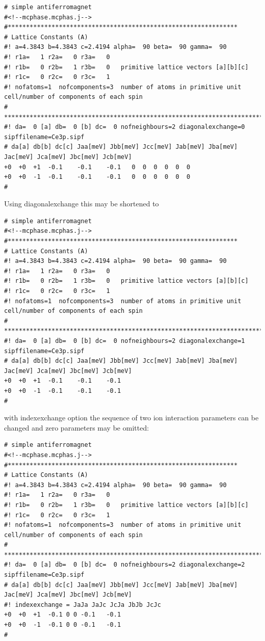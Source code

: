 {\small
\begin{verbatim} 
# simple antiferromagnet 
#<!--mcphase.mcphas.j-->
#***************************************************************
# Lattice Constants (A)
#! a=4.3843 b=4.3843 c=2.4194 alpha=  90 beta=  90 gamma=  90
#! r1a=   1 r2a=   0 r3a=   0
#! r1b=   0 r2b=   1 r3b=   0   primitive lattice vectors [a][b][c]
#! r1c=   0 r2c=   0 r3c=   1
#! nofatoms=1  nofcomponents=3  number of atoms in primitive unit cell/number of components of each spin
# ****************************************************************************
#! da=  0 [a] db=  0 [b] dc=  0 nofneighbours=2 diagonalexchange=0  sipffilename=Ce3p.sipf
# da[a] db[b] dc[c] Jaa[meV] Jbb[meV] Jcc[meV] Jab[meV] Jba[meV] Jac[meV] Jca[meV] Jbc[meV] Jcb[meV]
+0	+0	+1	-0.1	-0.1	-0.1   0  0  0  0  0  0
+0	+0	-1	-0.1	-0.1	-0.1   0  0  0  0  0  0
#\end{verbatim}
}

Using diagonalexchange this may be shortened to

{\small
\begin{verbatim} 
# simple antiferromagnet 
#<!--mcphase.mcphas.j-->
#***************************************************************
# Lattice Constants (A)
#! a=4.3843 b=4.3843 c=2.4194 alpha=  90 beta=  90 gamma=  90
#! r1a=   1 r2a=   0 r3a=   0
#! r1b=   0 r2b=   1 r3b=   0   primitive lattice vectors [a][b][c]
#! r1c=   0 r2c=   0 r3c=   1
#! nofatoms=1  nofcomponents=3  number of atoms in primitive unit cell/number of components of each spin
# ****************************************************************************
#! da=  0 [a] db=  0 [b] dc=  0 nofneighbours=2 diagonalexchange=1  sipffilename=Ce3p.sipf
# da[a] db[b] dc[c] Jaa[meV] Jbb[meV] Jcc[meV] Jab[meV] Jba[meV] Jac[meV] Jca[meV] Jbc[meV] Jcb[meV]
+0	+0	+1	-0.1	-0.1	-0.1   
+0	+0	-1	-0.1	-0.1	-0.1   
#\end{verbatim}
}

with indexexchange option the sequence of two ion interaction parameters can be changed and
zero parameters may be omitted:

{\small
\begin{verbatim} 
# simple antiferromagnet 
#<!--mcphase.mcphas.j-->
#***************************************************************
# Lattice Constants (A)
#! a=4.3843 b=4.3843 c=2.4194 alpha=  90 beta=  90 gamma=  90
#! r1a=   1 r2a=   0 r3a=   0
#! r1b=   0 r2b=   1 r3b=   0   primitive lattice vectors [a][b][c]
#! r1c=   0 r2c=   0 r3c=   1
#! nofatoms=1  nofcomponents=3  number of atoms in primitive unit cell/number of components of each spin
# ****************************************************************************
#! da=  0 [a] db=  0 [b] dc=  0 nofneighbours=2 diagonalexchange=2  sipffilename=Ce3p.sipf
# da[a] db[b] dc[c] Jaa[meV] Jbb[meV] Jcc[meV] Jab[meV] Jba[meV] Jac[meV] Jca[meV] Jbc[meV] Jcb[meV]
#! indexexchange = JaJa JaJc JcJa JbJb JcJc
+0	+0	+1	-0.1 0 0 -0.1	-0.1  
+0	+0	-1	-0.1 0 0 -0.1	-0.1  
#\end{verbatim}
}

